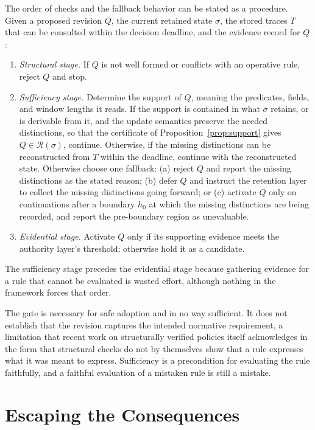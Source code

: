 \documentclass[11pt]{article}
\theoremstyle{definition}
\theoremstyle{remark}
\newcommand{\Hor}{\mathcal{R}}
\begin{document}
The order of checks and the fallback behavior can be stated as a procedure. Given a proposed revision $Q$, the current retained state $\sigma$, the stored traces $T$ that can be consulted within the decision deadline, and the evidence record for $Q$:
\begin{enumerate}
\item \emph{Structural stage.} If $Q$ is not well formed or conflicts with an operative rule, reject $Q$ and stop.
\item \emph{Sufficiency stage.} Determine the support of $Q$, meaning the predicates, fields, and window lengths it reads. If the support is contained in what $\sigma$ retains, or is derivable from it, and the update semantics preserve the needed distinctions, so that the certificate of Proposition~\ref{prop:support} gives $Q\in\Hor(\sigma)$, continue. Otherwise, if the missing distinctions can be reconstructed from $T$ within the deadline, continue with the reconstructed state. Otherwise choose one fallback: (a) reject $Q$ and report the missing distinctions as the stated reason; (b) defer $Q$ and instruct the retention layer to collect the missing distinctions going forward; or (c) activate $Q$ only on continuations after a boundary $h_0$ at which the missing distinctions are being recorded, and report the pre-boundary region as unevaluable.
\item \emph{Evidential stage.} Activate $Q$ only if its supporting evidence meets the authority layer's threshold; otherwise hold it as a candidate.
\end{enumerate}
The sufficiency stage precedes the evidential stage because gathering evidence for a rule that cannot be evaluated is wasted effort, although nothing in the framework forces that order.

The gate is necessary for safe adoption and in no way sufficient. It does not establish that the revision captures the intended normative requirement, a limitation that recent work on structurally verified policies itself acknowledges in the form that structural checks do not by themselves show that a rule expresses what it was meant to express. Sufficiency is a precondition for evaluating the rule faithfully, and a faithful evaluation of a mistaken rule is still a mistake.

\section{Escaping the Consequences}\label{sec:escapes}
\end{document}
